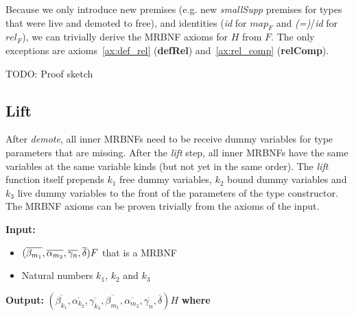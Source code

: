 \noindent
Because we only introduce new premises (e.g. new \textit{smallSupp} premises for types that were live and demoted to free), and identities (\textit{id} for $map_F$ and \textit{(=)}/\textit{id} for $rel_F$), we can trivially derive the \ac{MRBNF} axioms for $H$ from $F$. The only exceptions are axioms~\ref{ax:def_rel} (\textbf{defRel}) and~\ref{ax:rel_comp} (\textbf{relComp}).

TODO: Proof sketch

\subsection{Lift}\label{sec:lift}

After \textit{demote}, all inner \acp{MRBNF} need to be receive dummy variables for type parameters that are missing. After the \textit{lift} step, all inner \acp{MRBNF} have the same variables at the same variable kinds (but not yet in the same order). The \textit{lift} function itself prepends $k_1$ free dummy variables, $k_2$ bound dummy variables and $k_3$ live dummy variables to the front of the parameters of the type constructor. The \ac{MRBNF} axioms can be proven trivially from the axioms of the input.

\vspace*{1em}
\noindent
\textbf{Input:}
\begin{itemize}
\item{$(\overline{\beta_{m_1}}, \overline{\alpha_{m_2}}, \overline{\gamma_n}, \overline{\delta}) F$ that is a \ac{MRBNF}}
\item{Natural numbers $k_1$, $k_2$ and $k_3$}
\end{itemize}

\noindent
\textbf{Output:} $(\overline{\beta_{k_1}}, \overline{\alpha_{k_2}}, \overline{\gamma_{k_3}}, \overline{\beta_{m_1}}, \overline{\alpha_{m_2}}, \overline{\gamma_n}, \overline{\delta})H$ \textbf{where}

\vspace*{-2em}

